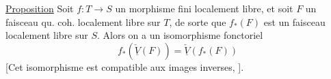 \uline{Proposition} Soit $f:T\to S$ un morphisme fini localement libre, et soit  $F$ un faisceau qu. coh. localement libre sur $T$, de sorte que $f_*(F)$ est un faisceau  localement libre sur $S$. Alors on a un isomorphisme fonctoriel
\[
\boxed{f_*(\underline{\check V}(F))=\underline{\check V}(f_*(F))}
\]
[Cet isomorphisme est compatible aux images inverses,  ].
